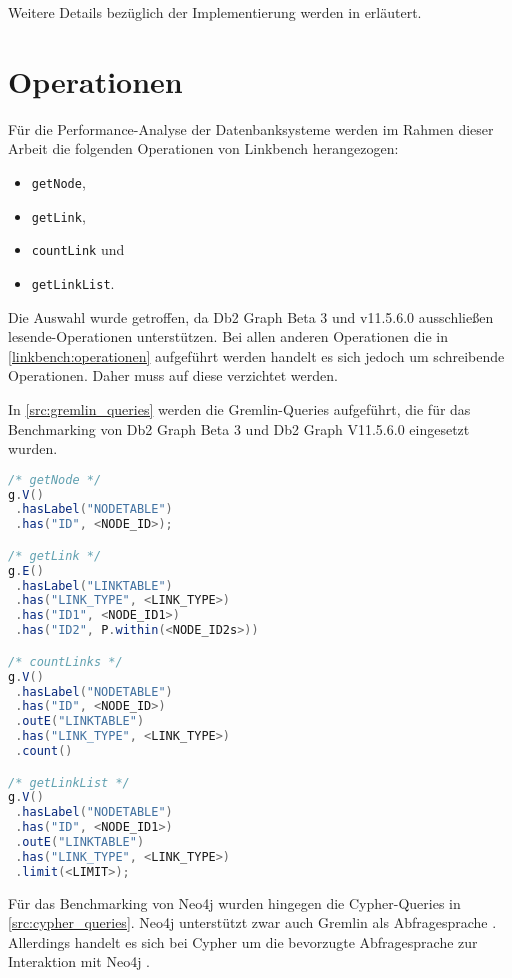 Weitere Details bezüglich der Implementierung werden in  erläutert.

\section{Operationen}
\label{analyse:operationen}
Für die Performance-Analyse der Datenbanksysteme werden im Rahmen dieser Arbeit die folgenden Operationen von Linkbench herangezogen:
\begin{itemize}
    \item \texttt{getNode},
    \item \texttt{getLink},
    \item \texttt{countLink} und
    \item \texttt{getLinkList}.
\end{itemize}
Die Auswahl wurde getroffen, da Db2 Graph Beta 3 und v11.5.6.0 ausschließen lesende-Operationen unterstützen. Bei allen anderen Operationen die in \autoref{linkbench:operationen} aufgeführt werden handelt es sich jedoch um schreibende Operationen. Daher muss auf diese verzichtet werden. 

In \autoref{src:gremlin_queries} werden die Gremlin-Queries aufgeführt, die für das Benchmarking von Db2 Graph Beta 3 und Db2 Graph V11.5.6.0 eingesetzt wurden. 
\begin{lstlisting}[label=src:gremlin_queries,caption={ Gremlin Queries (regulär)},language=Java]
/* getNode */
g.V()
 .hasLabel("NODETABLE")
 .has("ID", <NODE_ID>);

/* getLink */
g.E()
 .hasLabel("LINKTABLE")
 .has("LINK_TYPE", <LINK_TYPE>)
 .has("ID1", <NODE_ID1>)
 .has("ID2", P.within(<NODE_ID2s>))

/* countLinks */
g.V()
 .hasLabel("NODETABLE")
 .has("ID", <NODE_ID>)
 .outE("LINKTABLE")
 .has("LINK_TYPE", <LINK_TYPE>)
 .count()

/* getLinkList */
g.V()
 .hasLabel("NODETABLE")
 .has("ID", <NODE_ID1>)
 .outE("LINKTABLE")
 .has("LINK_TYPE", <LINK_TYPE>)
 .limit(<LIMIT>);
\end{lstlisting}

Für das Benchmarking von Neo4j wurden hingegen die  Cypher-Queries in \autoref{src:cypher_queries}. Neo4j unterstützt zwar auch Gremlin als Abfragesprache \cite{gdbms}. Allerdings handelt es sich bei Cypher um die bevorzugte Abfragesprache zur Interaktion mit Neo4j \cite{gdbms}.

